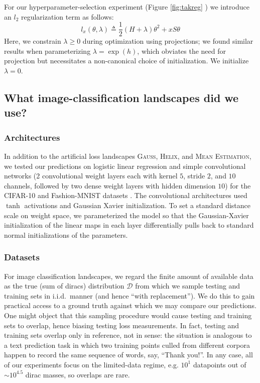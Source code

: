 \documentclass[anon,12pt]{colt2021} %
\newcommand{\ofthree}[1]{
    {\tiny \raisebox{0.04cm}{$
        \ifthenelse{\equal{#1}{0}}{{\color{moor}\blacksquare}}{\square}
        \ifthenelse{\equal{#1}{1}}{{\color{moor}\blacksquare}}{\square}    
        \ifthenelse{\equal{#1}{2}}{{\color{moor}\blacksquare}}{\square}
    $}}%
}
\newcommand{\Dd}{\mathcal{D}}
\newcommand{\Gauss}{\textsc{Gauss}}
\newcommand{\Helix}{\textsc{Helix}}
\newcommand{\MeanEstimation}{\textsc{Mean Estimation}}
\begin{document}
            For our hyperparameter-selection experiment (Figure
            \ref{fig:takreg}\ofthree{2}) we introduce an $l_2$
            regularization term as follows:
            $$
                l_x(\theta, \lambda)
                \triangleq
                \frac{1}{2} (H + \lambda) \theta^2 + x S \theta
            $$
            Here, we constrain $\lambda\geq 0$ during optimization using
            projections; we found similar results when parameterizing $\lambda
            = \exp(h)$, which obviates the need for projection but necessitates
            a non-canonical choice of initialization.  We initialize
            $\lambda=0$.

    \subsection{What image-classification landscapes did we use?}   \label{appendix:natural}

        \subsubsection{Architectures}
            In addition to the artificial loss landscapes
            \Gauss, \Helix, and \MeanEstimation, 
            we tested our predictions on logistic linear regression
            and simple convolutional networks (2 convolutional weight layers
            each with kernel $5$, stride $2$, and $10$ channels, followed by
            two dense weight layers with hidden dimension $10$) for the
            CIFAR-10 \cite{kr09} and Fashion-MNIST datasets \cite{xi17}.  The
            convolutional architectures used $\tanh$ activations and Gaussian
            Xavier initialization.  To set a standard distance scale on weight
            space, we parameterized the model so that the
            Gaussian-Xavier initialization of the linear maps in each layer
            differentially pulls back to standard normal initializations of the
            parameters.
            
        \subsubsection{Datasets}
            For image classification landscapes, we regard the finite amount of
            available data as the true (sum of diracs) distribution $\Dd$ from
            which we sample testing and training sets in i.i.d.\ manner (and hence
            ``with replacement'').  We do this to gain practical access to a
            ground truth against which we may compare our predictions.  One
            might object that this sampling procedure would cause testing and
            training sets to overlap, hence biasing testing loss measurements.  In
            fact, testing and training sets overlap only in reference, not in
            sense: the situation is analogous to a text prediction task in
            which two training points culled from different corpora happen to
            record the same sequence of words, say, ``Thank you!''.  In any
            case, all of our experiments focus on the limited-data regime, e.g.
            $10^1$ datapoints out of $\sim 10^{4.5}$ dirac masses, so overlaps
            are rare.
\end{document}
